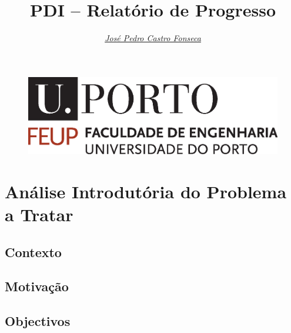 \documentclass[a4paper, onecolumn, 10pt]{article}
\title{\Huge PDI -- Relatório de Progresso}
\author{\itshape \href{mailto:ee11126@fe.up.pt}{José Pedro Castro Fonseca}   }
\begin{document}
\pagestyle{plain}

\begin{figure}
	\centering
	\includegraphics[scale=0.3]{logo_feup.eps}
\end{figure}
\sffamily
\maketitle



\rmfamily\pagestyle{fancy}
\section{Análise Introdutória do Problema a Tratar}
	
	\subsection{Contexto}


	\subsection{Motivação}

	\subsection{Objectivos}
\end{document}

